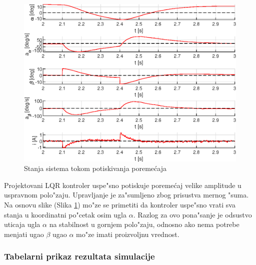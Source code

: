 \documentclass[a4paper,11pt]{article}
\theoremstyle{definition} \newtheorem{deff}{Definicija}[section]
\theoremstyle{definition} \newtheorem{prim}[deff]{Primer}
\theoremstyle{plain} \newtheorem{teor}[deff]{Teorema}
\begin{document}
	\begin{figure}[!h]
		\centering
		\includegraphics[width=.86\linewidth]{slike/States_dist.eps}
		\caption{Stanja sistema  tokom potiskivanja poreme\'caja}
		\label{fig:traj_dist}
	\end{figure}
	
	Projektovani LQR kontroler uspe"sno potiskuje poreme\'caj velike amplitude u uspravnom polo"zaju. Upravljanje je za"sumljeno zbog prisustva mernog "suma. Na osnovu slike (Slika \ref{fig:traj_dist}) mo"ze se primetiti da kontroler uspe"sno vrati sva stanja u koordinatni po"cetak osim ugla $\alpha$. Razlog za ovo pona"sanje je odsustvo uticaja ugla $\alpha$ na stabilnost u gornjem polo"zaju, odnosno ako nema potrebe menjati ugao $\beta$ ugao $\alpha$ mo"ze imati proizvoljnu vrednost.
	
	
	\clearpage
	\subsubsection{Tabelarni prikaz rezultata simulacije}\label{sec:tab}
	
\end{document}
